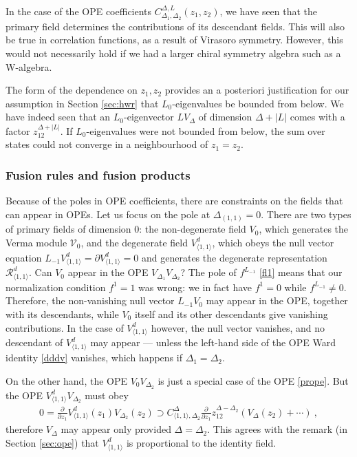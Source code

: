 \documentclass[12pt, a4paper]{article}
\theoremstyle{break}
\begin{document}
In the case of the OPE coefficients $C^{\Delta,L}_{\Delta_1,\Delta_2}(z_1,z_2)$, we have seen that the primary field determines the contributions of its descendant fields. This will also be true in correlation functions, as a result of Virasoro symmetry. However, this would not necessarily hold if we had a larger chiral symmetry algebra such as a W-algebra. 

The form of the dependence on $z_1,z_2$ provides an a posteriori justification for our assumption in Section \ref{sec:hwr} that $L_0$-eigenvalues be bounded from below. We have indeed seen that an $L_0$-eigenvector $LV_\Delta$ of dimension $\Delta+|L|$ comes with a factor $z_{12}^{\Delta+|L|}$. If $L_0$-eigenvalues were not bounded from below, the sum over states could not converge in a neighbourhood of $z_1=z_2$. 


\subsubsection{Fusion rules and fusion products}\label{sec:dope}

Because of the poles in OPE coefficients, there are constraints on the fields that can appear in OPEs. Let us focus on the pole at $\Delta_{(1,1)}=0$. There are two types of primary fields of dimension $0$: the non-degenerate field $V_0$, which generates the Verma module $\mathcal{V}_0$, and the degenerate field $V^d_{\langle 1,1\rangle}$, which obeys the null vector equation $L_{-1}V^d_{\langle 1,1\rangle}=\partial V^d_{\langle 1,1\rangle}=0$ and generates the degenerate representation $\mathcal{R}^d_{\langle 1,1\rangle}$. Can $V_0$ appear in the OPE $V_{\Delta_1}V_{\Delta_2}$? The pole of $f^{L_{-1}}$ \eqref{fl1} means that our normalization condition $f^1=1$ was wrong: we in fact have $f^1=0$ while $f^{L_{-1}}\neq 0$. Therefore, the non-vanishing null vector $L_{-1}V_0$ may appear in the OPE, together with its descendants, while $V_0$ itself and its other descendants give vanishing contributions. In the case of $V^d_{\langle 1,1\rangle}$ however, the null vector vanishes, and no descendant of $V^d_{\langle 1,1\rangle}$ may appear --- unless the left-hand side of the OPE Ward identity \eqref{dddv} vanishes, which happens if $\Delta_1=\Delta_2$. 

On the other hand, the OPE $V_0V_{\Delta_2}$ is just a special case of the OPE \eqref{prope}.
But the OPE $V^d_{\langle 1,1\rangle}V_{\Delta_2}$ must obey 
\begin{align}
 0 = \frac{\partial}{\partial z_1} V^d_{\langle 1,1\rangle}(z_1)V_{\Delta_2}(z_2) \supset C_{\langle 1,1\rangle,\Delta_2}^{\Delta} \frac{\partial}{\partial z_1} z_{12}^{\Delta-\Delta_2} \left(V_\Delta(z_2) +\cdots \right) \ ,
\end{align}
therefore $V_\Delta$ may appear only provided $\Delta=\Delta_2$. This agrees with the remark (in Section \ref{sec:ope}) that $V^d_{\langle 1,1\rangle}$ is proportional to the identity field. 
\end{document}
